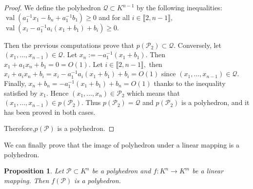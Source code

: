 \documentclass[a4paper,12pt]{article}
\newtheorem{proposition}[theorem]{Proposition}
\newcommand{\PP}{\mathcal{P}}
\newcommand{\Qc}{\mathcal{Q}}
\DeclareMathOperator{\val}{val}
\begin{document}
\begin{proof}
We define the polyhedron $\Qc \subset K^{n-1}$ by the following inequalities:
$\val(a_1^{-1}x_1- b_n +a_1^{-1}b_1) \geq 0$ and for all $i \in \llbracket 2,n-1 \rrbracket,$
$\val(x_i-a_1^{-1}a_i(x_1+b_1)+b_i) \geq 0.$

Then the previous computations prove that $p(\PP_2)\subset \Qc.$
Conversely, let $(x_1,\dots,x_{n-1}) \in \Qc.$
Let $x_n := -a_1^{-1}(x_1+b_1).$
Then
$x_1+a_1 x_n+b_1=0=O(1).$
Let $i \in \llbracket 2,n-1 \rrbracket,$
then $x_i+a_i x_n+b_i=x_i-a_1^{-1}a_i(x_1+b_1)+b_i=O(1)$
since $(x_1,\dots,x_{n-1}) \in \Qc.$
Finally, 
$x_n+b_n=-a_1^{-1}(x_1+b_1)+b_n=O(1)$ thanks to the inequality satisfied by $x_1.$
Hence $(x_1,\dots,x_n) \in \PP_2$
which means that $(x_1,\dots,x_{n-1}) \in p(\PP_2).$
Thus $p(\PP_2)= \Qc$ and $p(\PP_2)$ is a polyhedron,
and it has been proved in both cases.

Therefore,$p(\PP)$ is a polyhedron.

\end{proof}

We can finally prove that the image of polyhedron under a linear mapping is a polyhedron.
\begin{proposition}
Let $\PP \subset K^n$ be a polyhedron and $f: K^n \rightarrow K^m$
be a linear mapping. Then $f(\PP)$ is a polyhedron.
\end{proposition}
\end{document}
